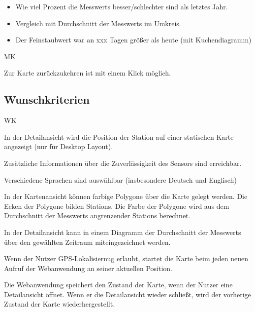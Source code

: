 \begin{itemize}
	\item Wie viel Prozent die \glspl{Messwert} besser/schlechter sind als letztes Jahr.
    \item Vergleich mit Durchschnitt der \glspl{Messwert} im Umkreis.
    \item Der Feinstaubwert war an xxx Tagen größer als heute (mit \gls{Kuchendiagramm})
\end{itemize}

\begin{Kriterien}{MK}	
	\item Zur Karte zurückzukehren ist mit einem Klick möglich.
\end{Kriterien}

\newpage
\subsection{Wunschkriterien}
\setcounter{counter}{10}
\begin{Kriterien}{WK}

	\item In der \gls{Detailansicht} wird die Position der \gls{Station} auf einer statischen Karte angezeigt (nur für Desktop 
	Layout). 

	\item Zusätzliche Informationen über die Zuverlässigkeit des Sensors sind erreichbar.

	\item Verschiedene Sprachen sind auswählbar (insbesondere Deutsch und Englisch)
	
	\item In der \gls{Kartenansicht} können farbige Polygone über die Karte gelegt werden. Die Ecken der Polygone bilden \glspl{Station}. Die Farbe der Polygone wird aus dem Durchschnitt der \glspl{Messwert} angrenzender \glspl{Station} berechnet.
	
	\item In der \gls{Detailansicht} kann in einem Diagramm der Durchschnitt der \glspl{Messwert} über den gewählten Zeitraum miteingezeichnet werden.
	
	\item Wenn der Nutzer GPS-Lokalisiernug erlaubt, startet die Karte beim jeden neuen Aufruf der \gls{Webanwendung} an seiner aktuellen Position.
	
	\item Die Webanwendung speichert den Zustand der Karte, wenn der Nutzer eine \gls{Detailansicht} öffnet. Wenn er die \gls{Detailansicht} wieder schließt, wird der vorherige Zustand der Karte wiederhergestellt.

\end{Kriterien}

